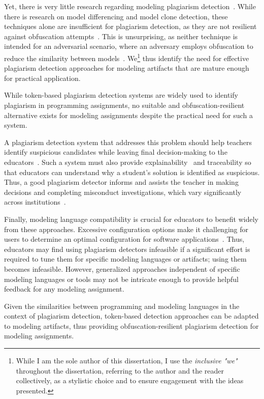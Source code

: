 Yet, there is very little research regarding modeling plagiarism detection~\cite{Martinez2020, Saglam2022, Saglam2023}.
While there is research on model differencing and model clone detection, these techniques alone are insufficient for plagiarism detection, as they are not resilient against obfuscation attempts~\cite{Wittler2023, Saglam2022, Martinez2020}.
This is unsurprising, as neither technique is intended for an adversarial scenario, where an adversary employs obfuscation to reduce the similarity between models~\cite{Saglam2022}.
%
We\footnote{While I am the sole author of this dissertation, I use the \textit{inclusive "we"} throughout the dissertation, referring to the author and the reader collectively, as a stylistic choice and to ensure engagement with the ideas presented.} thus identify the need for effective plagiarism detection approaches for modeling artifacts that are mature enough for practical application.
%
    \begin{problem}\label{problem2}
    While token-based plagiarism detection systems are widely used to identify plagiarism in programming assignments, no suitable and obfuscation-resilient alternative exists for modeling assignments despite the practical need for such a system.
    \end{problem} %
%
A plagiarism detection system that addresses this problem should help teachers identify suspicious candidates while leaving final decision-making to the educators~\cite{Culwin2001, Weber2019}.
Such a system must also provide explainability~\cite{Karnalim2021} and traceability so that educators can understand why a student's solution is identified as suspicious.
Thus, a good plagiarism detector informs and assists the teacher in making decisions and completing misconduct investigations, which vary significantly across institutions~\cite{Culwin2001, Simon2013}.

Finally, modeling language compatibility is crucial for educators to benefit widely from these approaches.
Excessive configuration options make it challenging for users to determine an optimal configuration for software applications~\cite{Schmid2022, Schmid2024}.
Thus, educators may find using plagiarism detectors infeasible if a significant effort is required to tune them for specific modeling languages or artifacts; using them becomes infeasible.
However, generalized approaches independent of specific modeling languages or tools may not be intricate enough to provide helpful feedback for any modeling assignment.
%
    \begin{hypothesis} \label{hypo3} Given the similarities between programming and modeling languages in the context of plagiarism detection, token-based detection approaches can be adapted to modeling artifacts, thus providing obfuscation-resilient plagiarism detection for modeling assignments.
    \end{hypothesis}

